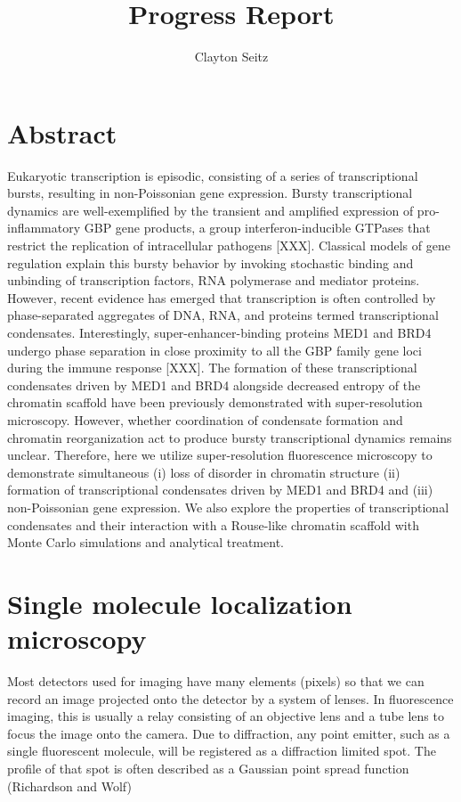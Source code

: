 \documentclass{article}
\begin{document}
\title{Progress Report}
\author{Clayton Seitz}
\maketitle
\thispagestyle{empty}


\section{Abstract}

Eukaryotic transcription is episodic, consisting of a series of transcriptional bursts, resulting in non-Poissonian gene expression. Bursty transcriptional dynamics are well-exemplified by the transient and amplified expression of pro-inflammatory GBP gene products, a group interferon-inducible GTPases that restrict the replication of intracellular pathogens [XXX]. Classical models of gene regulation explain this bursty behavior by invoking stochastic binding and unbinding of transcription factors, RNA polymerase and mediator proteins. However, recent evidence has emerged that transcription is often controlled by phase-separated aggregates of DNA, RNA, and proteins termed transcriptional condensates. Interestingly, super-enhancer-binding proteins MED1 and BRD4 undergo phase separation in close proximity to all the GBP family gene loci during the immune response [XXX]. The formation of these transcriptional condensates driven by MED1 and BRD4 alongside decreased entropy of the chromatin scaffold have been previously demonstrated with super-resolution microscopy. However, whether coordination of condensate formation and chromatin reorganization act to produce bursty transcriptional dynamics remains unclear. Therefore, here we utilize super-resolution fluorescence microscopy to demonstrate simultaneous (i) loss of disorder in chromatin structure (ii) formation of transcriptional condensates driven by MED1 and BRD4 and (iii) non-Poissonian gene expression. We also explore the properties of transcriptional condensates and their interaction with a Rouse-like chromatin scaffold with Monte Carlo simulations and analytical treatment.

\section{Single molecule localization microscopy}

Most detectors used for imaging have many elements (pixels) so that we can record an image projected onto the detector by a system of lenses. In fluorescence imaging, this is usually a relay consisting of an objective lens and a tube lens to focus the image onto the camera. Due to diffraction, any point emitter, such as a single fluorescent molecule, will be registered as a diffraction limited spot. The profile of that spot is often described as a Gaussian point spread function (Richardson and Wolf)
\end{document}
